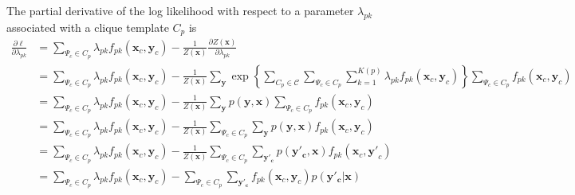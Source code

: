The partial derivative of the log likelihood with respect to a parameter
$\lambda_{pk}$ associated with a clique template $C_p$ is
\begin{align}
\frac{\partial\ell}{\partial\lambda_{pk}} 
&= \sum_{\Psi_c\in C_p}\lambda_{pk}f_{pk}(\mathbf{x}_c, \mathbf{y}_c) -
\frac{1}{Z(\mathbf{x})}\frac{\partial Z(\mathbf{x})}{\partial\lambda_{pk}}\\
&= \sum_{\Psi_c\in C_p}\lambda_{pk}f_{pk}(\mathbf{x}_c, \mathbf{y}_c) -
\frac{1}{Z(\mathbf{x})}\sum_{\mathbf{y}}\exp\left\{\sum_{C_p\in\mathcal{C}}\sum_{\Psi_c\in
C_p}\sum_{k=1}^{K(p)}\lambda_{pk}f_{pk}(\mathbf{x}_c,
\mathbf{y}_c)\right\}\sum_{\Psi_c\in C_p}f_{pk}(\mathbf{x}_c, \mathbf{y}_c) \\
&= \sum_{\Psi_c\in C_p}\lambda_{pk}f_{pk}(\mathbf{x}_c, \mathbf{y}_c) -
\frac{1}{Z(\mathbf{x})}\sum_{\mathbf{y}}p(\mathbf{y}, \mathbf{x})\sum_{\Psi_c\in
C_p}f_{pk}(\mathbf{x}_c, \mathbf{y}_c) \\
&= \sum_{\Psi_c\in C_p}\lambda_{pk}f_{pk}(\mathbf{x}_c, \mathbf{y}_c) -
\frac{1}{Z(\mathbf{x})}\sum_{\Psi_c\in C_p}\sum_{\mathbf{y}}p(\mathbf{y},
\mathbf{x})f_{pk}(\mathbf{x}_c, \mathbf{y}_c) \\
&= \sum_{\Psi_c\in C_p}\lambda_{pk}f_{pk}(\mathbf{x}_c, \mathbf{y}_c) -
\frac{1}{Z(\mathbf{x})}\sum_{\Psi_c\in C_p}\sum_{\mathbf{y'_c}}p(\mathbf{y'_c},
\mathbf{x})f_{pk}(\mathbf{x}_c, \mathbf{y'}_c) \\
&= \sum_{\Psi_c\in C_p}\lambda_{pk}f_{pk}(\mathbf{x}_c, \mathbf{y}_c) -
\sum_{\Psi_c\in C_p}\sum_{\mathbf{y'_c}}f_{pk}(\mathbf{x}_c, \mathbf{y}_c)p(\mathbf{y'_c}
| \mathbf{x})
\end{align}
